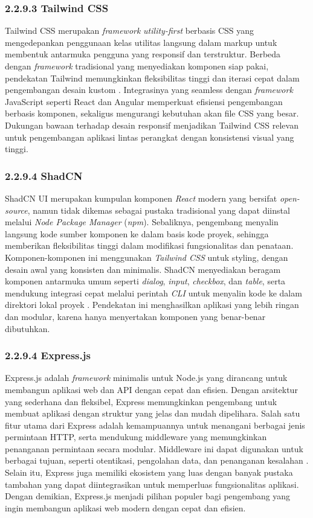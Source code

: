 \subsubsection{2.2.9.3 Tailwind CSS}

Tailwind CSS merupakan \emph{framework} \emph{utility-first} berbasis CSS yang mengedepankan penggunaan kelas utilitas langsung dalam markup untuk membentuk antarmuka pengguna yang responsif dan terstruktur. Berbeda dengan \emph{framework} tradisional yang menyediakan komponen siap pakai, pendekatan Tailwind memungkinkan fleksibilitas tinggi dan iterasi cepat dalam pengembangan desain kustom \cite{Azhariyah2024}. Integrasinya yang seamless dengan \emph{framework} JavaScript seperti React dan Angular memperkuat efisiensi pengembangan berbasis komponen, sekaligus mengurangi kebutuhan akan file CSS yang besar. Dukungan bawaan terhadap desain responsif menjadikan Tailwind CSS relevan untuk pengembangan aplikasi lintas perangkat dengan konsistensi visual yang tinggi.

\subsubsection{2.2.9.4 ShadCN}

ShadCN UI merupakan kumpulan komponen \emph{React} modern yang bersifat \emph{open-source}, namun tidak dikemas sebagai pustaka tradisional yang dapat diinstal melalui \emph{Node Package Manager} (\emph{npm}). Sebaliknya, pengembang menyalin langsung kode sumber komponen ke dalam basis kode proyek, sehingga memberikan fleksibilitas tinggi dalam modifikasi fungsionalitas dan penataan. Komponen-komponen ini menggunakan \emph{Tailwind CSS} untuk styling, dengan desain awal yang konsisten dan minimalis. ShadCN menyediakan beragam komponen antarmuka umum seperti \emph{dialog}, \emph{input}, \emph{checkbox}, dan \emph{table}, serta mendukung integrasi cepat melalui perintah \emph{CLI} untuk menyalin kode ke dalam direktori lokal proyek \cite{Shadcn2024}. Pendekatan ini menghasilkan aplikasi yang lebih ringan dan modular, karena hanya menyertakan komponen yang benar-benar dibutuhkan.

\subsubsection{2.2.9.4 Express.js}
Express.js adalah \emph{framework} minimalis untuk Node.js yang dirancang untuk membangun aplikasi web dan API dengan cepat dan efisien. Dengan arsitektur yang sederhana dan fleksibel, Express memungkinkan pengembang untuk membuat aplikasi dengan struktur yang jelas dan mudah dipelihara. Salah satu fitur utama dari Express adalah kemampuannya untuk menangani berbagai jenis permintaan HTTP, serta mendukung middleware yang memungkinkan penanganan permintaan secara modular. Middleware ini dapat digunakan untuk berbagai tujuan, seperti otentikasi, pengolahan data, dan penanganan kesalahan \cite{express2023docs}. Selain itu, Express juga memiliki ekosistem yang luas dengan banyak pustaka tambahan yang dapat diintegrasikan untuk memperluas fungsionalitas aplikasi. Dengan demikian, Express.js menjadi pilihan populer bagi pengembang yang ingin membangun aplikasi web modern dengan cepat dan efisien.

